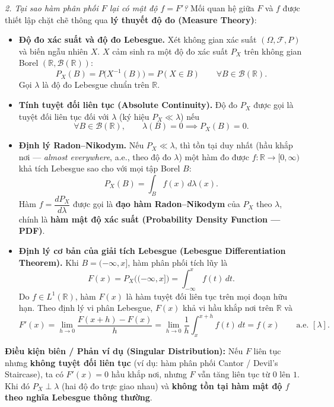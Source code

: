 \textit{2. Tại sao hàm phân phối $F$ lại có mật độ $f=F'$?} Mối quan hệ giữa $F$ và $f$ được thiết lập chặt chẽ thông qua \textbf{lý thuyết độ đo (Measure Theory)}:
\begin{itemize}
\item \textbf{Độ đo xác suất và độ đo Lebesgue.} Xét không gian xác suất $(\Omega,\mathcal{F},P)$ và biến ngẫu nhiên $X$. $X$ cảm sinh ra một độ đo xác suất $P_X$ trên không gian Borel $(\mathbb{R},\mathcal{B}(\mathbb{R}))$:
\[ P_X(B)=P\big(X^{-1}(B)\big)=P(X\in B)\qquad \forall B\in\mathcal{B}(\mathbb{R}). \]
Gọi $\lambda$ là độ đo Lebesgue chuẩn trên $\mathbb{R}$.
\item \textbf{Tính tuyệt đối liên tục (Absolute Continuity).} Độ đo $P_X$ được gọi là tuyệt đối liên tục đối với $\lambda$ (ký hiệu $P_X\ll\lambda$) nếu
\[ \forall B\in\mathcal{B}(\mathbb{R}),\qquad \lambda(B)=0\implies P_X(B)=0. \]
\item \textbf{Định lý Radon--Nikodym.} Nếu $P_X\ll\lambda$, thì tồn tại duy nhất (hầu khắp nơi --- \emph{almost everywhere}, a.e., theo độ đo $\lambda$) một hàm đo được $f:\mathbb{R}\to[0,\infty)$ khả tích Lebesgue sao cho với mọi tập Borel $B$:
\[ P_X(B)=\int_B f(x)\,d\lambda(x). \]
Hàm $f=\dfrac{dP_X}{d\lambda}$ được gọi là \textbf{đạo hàm Radon--Nikodym} của $P_X$ theo $\lambda$, chính là \textbf{hàm mật độ xác suất (Probability Density Function --- PDF)}.
\item \textbf{Định lý cơ bản của giải tích Lebesgue (Lebesgue Differentiation Theorem).} Khi $B=(-\infty,x]$, hàm phân phối tích lũy là
\[ F(x)=P_X\big((-\infty,x]\big)=\int_{-\infty}^{x}f(t)\,dt. \]
Do $f\in L^1(\mathbb{R})$, hàm $F(x)$ là hàm tuyệt đối liên tục trên mọi đoạn hữu hạn. Theo định lý vi phân Lebesgue, $F(x)$ khả vi hầu khắp nơi trên $\mathbb{R}$ và
\[ F'(x)=\lim_{h\to 0}\frac{F(x+h)-F(x)}{h}=\lim_{h\to 0}\frac1h\int_x^{x+h}f(t)\,dt=f(x)\qquad \text{a.e. }[\lambda]. \]
\end{itemize}

\begin{ghichu}
\textbf{Điều kiện biên / Phản ví dụ (Singular Distribution):} Nếu $F$ liên tục nhưng \textbf{không tuyệt đối liên tục} (ví dụ: hàm phân phối Cantor / Devil's Staircase), ta có $F'(x)=0$ hầu khắp nơi, nhưng $F$ vẫn tăng liên tục từ $0$ lên $1$. Khi đó $P_X\perp\lambda$ (hai độ đo trực giao nhau) và \textbf{không tồn tại hàm mật độ $f$ theo nghĩa Lebesgue thông thường}.
\end{ghichu}

